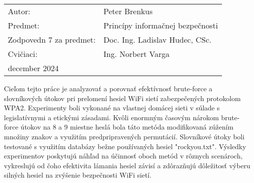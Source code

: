 \documentclass[12pt, twoside]{book}
\def\mfrok{december 2024}
\def\mfautor{Peter Brenkus}
\def\mfveduci{Ing. Norbert Varga}
\def\mfpredmet{Princ\'{i}py informa\v{c}nej bezpe\v{c}nosti}
\def\mfgarant{Doc. Ing. Ladislav Hudec, CSc.}
\begin{document}
\begin{tabular}{@{}ll}
Autor: & \mfautor\\
Predmet: & \mfpredmet \\
Zodpovedn 7 za predmet: &  \mfgarant \\
Cvičiaci: & \mfveduci \\
\mfrok
\end{tabular}

\bigskip
\bigskip 
\bigskip 
\noindent

Cieľom tejto práce je analyzovať a porovnať efektívnosť brute-force a slovníkových útokov pri prelomení hesiel WiFi sietí zabezpečených protokolom WPA2. Experimenty boli vykonané na vlastnej domácej sieti v súlade s legislatívnymi a etickými zásadami. Kvôli enormným časovým nárokom brute-force útokov na 8 a 9 miestne heslá bola táto metóda modifikovaná zúžením množiny znakov a využitím predpripravených permutácií. Slovníkové útoky boli testované s využitím databázy bežne používaných hesiel "rockyou.txt". Výsledky experimentov poskytujú náhľad na účinnosť oboch metód v rôznych scenároch, vykreslujú od čoho efektivita lámania hesiel závisí a zdôrazňujú dôležitosť výberu silných hesiel na zvýšenie bezpečnosti WiFi sietí.



\newpage 
\pagestyle{plain}
\setcounter{page}{13}
\fancyfoot[C]{\thepage}
\setlength\cftaftertoctitleskip{20pt}
\tableofcontents




\newpage


\listoffigures
\end{document}
